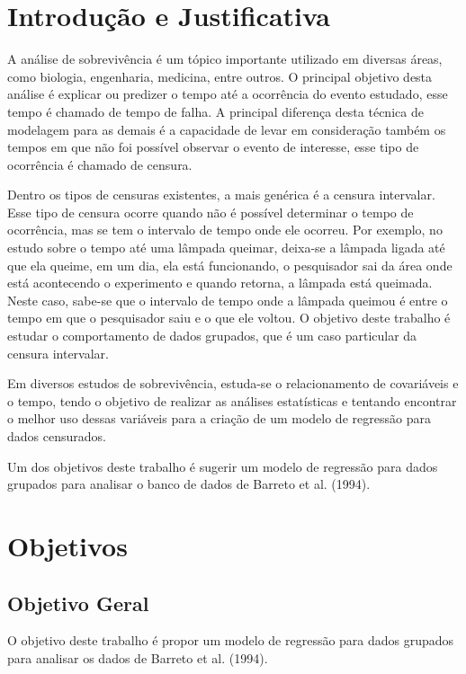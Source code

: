 

\section*{Introdução e Justificativa}

A análise de sobrevivência é um tópico importante utilizado em diversas áreas, como biologia, engenharia, medicina, entre outros. O principal objetivo desta análise é explicar ou predizer o tempo até a ocorrência do evento estudado, esse tempo é chamado de tempo de falha. A principal diferença desta técnica de modelagem para as demais é a capacidade de levar em consideração também os tempos em que não foi possível observar o evento de interesse, esse tipo de ocorrência é chamado de censura.

Dentro os tipos de censuras existentes, a mais genérica é a censura intervalar. Esse tipo de censura ocorre quando não é possível determinar o tempo de ocorrência, mas se tem o intervalo de tempo onde ele ocorreu. Por exemplo, no estudo sobre o tempo até uma lâmpada queimar, deixa-se a lâmpada ligada até que ela queime, em um dia, ela está funcionando, o pesquisador sai da área onde está acontecendo o experimento e quando retorna, a lâmpada está queimada. Neste caso, sabe-se que o intervalo de tempo onde a lâmpada queimou é entre o tempo em que o pesquisador saiu e o que ele voltou. O objetivo deste trabalho é estudar o comportamento de dados grupados, que é um caso particular da censura intervalar.

Em diversos estudos de sobrevivência, estuda-se o relacionamento de covariáveis e o tempo, tendo o objetivo de realizar as análises estatísticas e tentando encontrar o melhor uso dessas variáveis para a criação de um modelo de regressão para dados censurados.

Um dos objetivos deste trabalho é sugerir um modelo de regressão para dados grupados para analisar o banco de dados de Barreto et al. (1994).

\section*{Objetivos}


\subsection*{Objetivo Geral}

O objetivo deste trabalho é propor um modelo de regressão para dados grupados para analisar os dados de Barreto et al. (1994).

